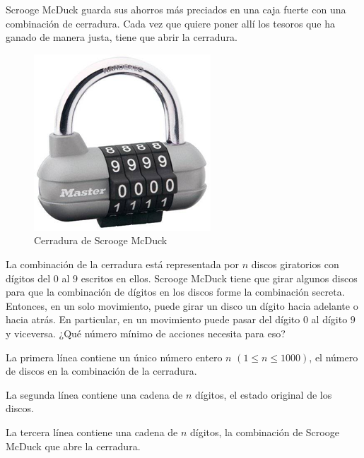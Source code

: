 
Scrooge McDuck guarda sus ahorros más preciados en una caja fuerte con una combinación de cerradura. Cada vez que quiere poner allí los tesoros que ha ganado de manera justa, tiene que abrir la cerradura.

\begin{figure}[h]
    \centering
    \caption{Cerradura de Scrooge McDuck}
    \includegraphics[scale=.5]{template/CombinacionDeLaCerradura/images/cerradura.png}
\end{figure}

La combinación de la cerradura está representada por $n$ discos giratorios con dígitos del $0$ al $9$ escritos en ellos. Scrooge McDuck tiene que girar algunos discos para que la combinación de dígitos en los discos forme la combinación secreta. Entonces, en un solo movimiento, puede girar un disco un dígito hacia adelante o hacia atrás. En particular, en un movimiento puede pasar del dígito $0$ al dígito $9$ y viceversa. ¿Qué número mínimo de acciones necesita para eso?


La primera línea contiene un único número entero $n$ $(1 \le n \le 1000)$, el número de discos en la combinación de la cerradura.

La segunda línea contiene una cadena de $n$ dígitos, el estado original de los discos.

La tercera línea contiene una cadena de $n$ dígitos, la combinación de Scrooge McDuck que abre la cerradura.

